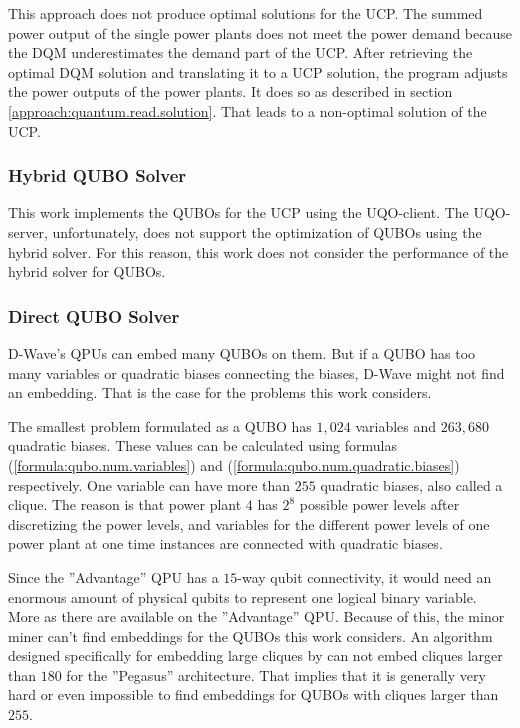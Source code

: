 This approach does not produce optimal solutions for the UCP.
The summed power output of the single power plants does not meet the power demand because the DQM underestimates the demand part of the UCP.
After retrieving the optimal DQM solution and translating it to a UCP solution, the program adjusts the power outputs of the power plants.
It does so as described in section \ref{approach:quantum.read.solution}.
That leads to a non-optimal solution of the UCP.

\subsubsection{Hybrid QUBO Solver}

This work implements the QUBOs for the UCP using the UQO-client.
The UQO-server, unfortunately, does not support the optimization of QUBOs using the hybrid solver.
For this reason, this work does not consider the performance of the hybrid solver for QUBOs.

\subsubsection{Direct QUBO Solver}

D-Wave's QPUs can embed many QUBOs on them.
But if a QUBO has too many variables or quadratic biases connecting the biases, D-Wave might not find an embedding.
That is the case for the problems this work considers.

The smallest problem formulated as a QUBO has $1, 024$ variables and $263, 680$ quadratic biases.
These values can be calculated using formulas (\ref{formula:qubo.num.variables}) and (\ref{formula:qubo.num.quadratic.biases}) respectively.
One variable can have more than $255$ quadratic biases, also called a clique.
The reason is that power plant $4$ has $2^8$ possible power levels after discretizing the power levels, and variables for the different power levels of one power plant at one time instances are connected with quadratic biases.

Since the ''Advantage'' QPU has a $15$-way qubit connectivity, it would need an enormous amount of physical qubits to represent one logical binary variable.
More as there are available on the ''Advantage'' QPU.
\cite{D-Wave2020, Zbinden2020}
Because of this, the minor miner can't find embeddings for the QUBOs this work considers.
An algorithm designed specifically for embedding large cliques by \citeauthor{Zbinden2020} can not embed cliques larger than $180$ for the ''Pegasus'' architecture.
\cite{Zbinden2020}
That implies that it is generally very hard or even impossible to find embeddings for QUBOs with cliques larger than $255$.
